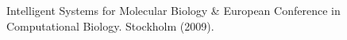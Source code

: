 
\colorbox{qmuldarkblue}
{
 \color{white}
 \parbox{1.0\textwidth}
 {
  \vspace{0.8cm}

  \begin{center}
 Intelligent Systems for Molecular Biology \& European Conference in Computational Biology. Stockholm (2009).
  \end{center}

 }
}
